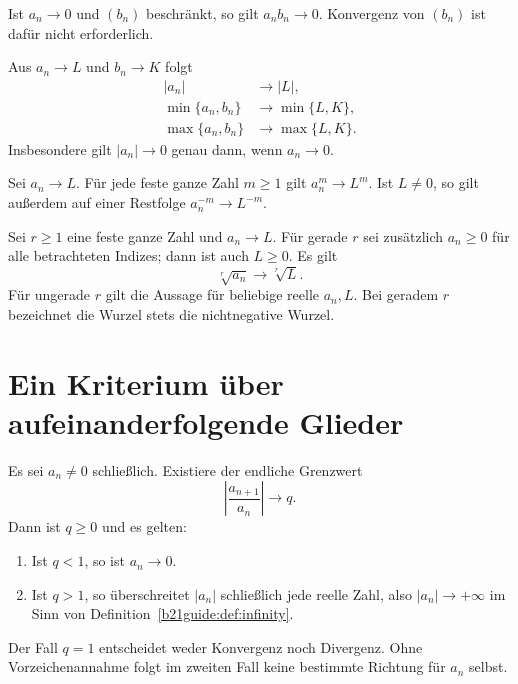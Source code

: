 \begin{theorem}
\label{b21guide:thm:null-bounded}
Ist $a_n\to0$ und $(b_n)$ beschränkt, so gilt $a_nb_n\to0$.
Konvergenz von $(b_n)$ ist dafür nicht erforderlich.
\end{theorem}

\begin{theorem}
Aus $a_n\to L$ und $b_n\to K$ folgt
\[
 \begin{aligned}
 |a_n|&\to |L|,\\
 \min\{a_n,b_n\}&\to\min\{L,K\},\\
 \max\{a_n,b_n\}&\to\max\{L,K\}.
 \end{aligned}
\]
Insbesondere gilt $|a_n|\to0$ genau dann, wenn $a_n\to0$.
\end{theorem}

\begin{theorem}
Sei $a_n\to L$. Für jede feste ganze Zahl $m\geq1$ gilt
$a_n^m\to L^m$.
Ist $L\ne0$, so gilt außerdem auf einer Restfolge
$a_n^{-m}\to L^{-m}$.
\end{theorem}

\begin{theorem}
\label{b21guide:thm:roots}
Sei $r\geq1$ eine feste ganze Zahl und $a_n\to L$.
Für gerade $r$ sei zusätzlich $a_n\geq0$ für alle betrachteten
Indizes; dann ist auch $L\geq0$. Es gilt
\[
 \sqrt[r]{a_n}\longrightarrow\sqrt[r]{L}.
\]
Für ungerade $r$ gilt die Aussage für beliebige reelle $a_n,L$.
Bei geradem $r$ bezeichnet die Wurzel stets die nichtnegative Wurzel.
\end{theorem}

\section{Ein Kriterium über aufeinanderfolgende Glieder}

\begin{theorem}
\label{b21guide:thm:ratio}
Es sei $a_n\ne0$ schließlich. Existiere der endliche Grenzwert
\[
 \left|\frac{a_{n+1}}{a_n}\right|\longrightarrow q.
\]
Dann ist $q\geq0$ und es gelten:
\begin{enumerate}
 \item Ist $q<1$, so ist $a_n\to0$.
 \item Ist $q>1$, so überschreitet $|a_n|$ schließlich
 jede reelle Zahl, also $|a_n|\to+\infty$ im Sinn von
 Definition~\ref{b21guide:def:infinity}.
\end{enumerate}
Der Fall $q=1$ entscheidet weder Konvergenz noch Divergenz.
Ohne Vorzeichenannahme folgt im zweiten Fall keine bestimmte
Richtung für $a_n$ selbst.
\end{theorem}

